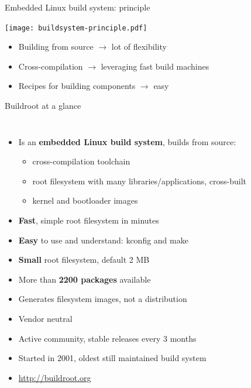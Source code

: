 \documentclass[aspectratio=169,obeyspaces,spaces,hyphens,dvipsnames]{beamer}
\begin{document}
\begin{frame}{Embedded Linux build system: principle}
  \begin{center}
    \texttt{[image: buildsystem-principle.pdf]}
  \end{center}
  \begin{itemize}[<+->]
  \item Building from source $\rightarrow$ lot of flexibility
  \item Cross-compilation $\rightarrow$ leveraging fast build machines
  \item Recipes for building components $\rightarrow$ easy
  \end{itemize}
\end{frame}

\begin{frame}{Buildroot at a glance}
  \begin{columns}
  \begin{itemize}
  \item Is an {\bf embedded Linux build system}, builds from source:
    \begin{itemize}
    \item cross-compilation toolchain
    \item root filesystem with many libraries/applications, cross-built
    \item kernel and bootloader images
    \end{itemize}
  \item {\bf Fast}, simple root filesystem in minutes
  \item {\bf Easy} to use and understand: kconfig and make
  \item {\bf Small} root filesystem, default 2 MB
  \item More than {\bf 2200 packages} available
  \item Generates filesystem images, not a distribution
  \item Vendor neutral
  \item Active community, stable releases every 3 months
  \item Started in 2001, oldest still maintained build system
  \item \url{http://buildroot.org}
  \end{itemize}

\end{columns}
\end{frame}
\end{document}

